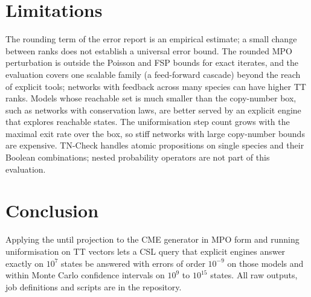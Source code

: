 \documentclass[11pt]{article}
\begin{document}
\section{Limitations}

The rounding term of the error report is an empirical estimate; a small change
between ranks does not establish a universal error bound. The rounded MPO
perturbation is outside the Poisson and FSP bounds for exact iterates, and the evaluation
covers one scalable family (a feed-forward cascade) beyond the reach of explicit tools;
networks with feedback across many species can have higher TT ranks. Models whose
reachable set is much smaller than the copy-number box, such as networks with
conservation laws, are better served by an explicit engine that explores reachable
states. The uniformisation step count grows with the maximal exit rate over the box,
so stiff networks with large copy-number bounds are expensive. TN-Check handles atomic
propositions on single species and their Boolean combinations; nested probability
operators are not part of this evaluation.

\section{Conclusion}

Applying the until projection to the CME generator in MPO form and running
uniformisation on TT vectors lets a CSL query that explicit engines answer exactly on
$10^7$ states be answered with errors of order $10^{-9}$ on those models and within
Monte Carlo confidence intervals on $10^{9}$ to $10^{15}$ states. All raw outputs, job
definitions and scripts are in the repository.
\end{document}
